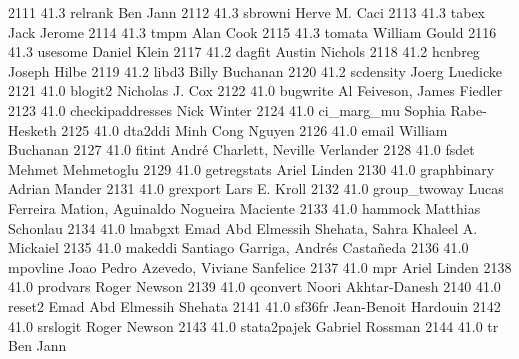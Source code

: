   2111     41.3    relrank       Ben Jann                                
  2112     41.3    sbrowni       Herve M. Caci                           
  2113     41.3    tabex         Jack Jerome                             
  2114     41.3    tmpm          Alan Cook                               
  2115     41.3    tomata        William Gould                           
  2116     41.3    usesome       Daniel Klein                            
  2117     41.2    dagfit        Austin Nichols                          
  2118     41.2    hcnbreg       Joseph Hilbe                            
  2119     41.2    libd3         Billy Buchanan                          
  2120     41.2    scdensity     Joerg Luedicke                          
  2121     41.0    blogit2       Nicholas J. Cox                         
  2122     41.0    bugwrite      Al Feiveson, James Fiedler              
  2123     41.0    checkipaddresses  Nick Winter                             
  2124     41.0    ci_marg_mu    Sophia Rabe-Hesketh                     
  2125     41.0    dta2ddi       Minh Cong Nguyen                        
  2126     41.0    email         William Buchanan                        
  2127     41.0    fitint        André Charlett, Neville Verlander      
  2128     41.0    fsdet         Mehmet Mehmetoglu                       
  2129     41.0    getregstats   Ariel Linden                            
  2130     41.0    graphbinary   Adrian Mander                           
  2131     41.0    grexport      Lars E. Kroll                           
  2132     41.0    group_twoway  Lucas Ferreira Mation, Aguinaldo        
                                   Nogueira Maciente                       
  2133     41.0    hammock       Matthias Schonlau                       
  2134     41.0    lmabgxt       Emad Abd Elmessih Shehata, Sahra        
                                   Khaleel A. Mickaiel                     
  2135     41.0    makeddi       Santiago Garriga, Andrés Castañeda    
  2136     41.0    mpovline      Joao Pedro Azevedo, Viviane Sanfelice   
  2137     41.0    mpr           Ariel Linden                            
  2138     41.0    prodvars      Roger Newson                            
  2139     41.0    qconvert      Noori Akhtar-Danesh                     
  2140     41.0    reset2        Emad Abd Elmessih Shehata               
  2141     41.0    sf36fr        Jean-Benoit Hardouin                    
  2142     41.0    srslogit      Roger Newson                            
  2143     41.0    stata2pajek   Gabriel Rossman                         
  2144     41.0    tr            Ben Jann                                
